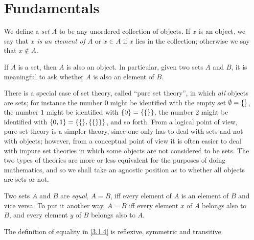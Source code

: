 \section{Fundamentals}\label{sec:3.1}

\begin{defn}\label{3.1.1}
	We define a \emph{set} \(A\) to be any unordered collection of objects.
	If \(x\) is an object, we say that \emph{\(x\) is an element of \(A\)} or \(x \in A\) if \(x\) lies in the collection;
	otherwise we say that \(x \notin A\).
\end{defn}

\begin{ax}\label{3.1}
	If \(A\) is a set, then \(A\) is also an object.
	In particular, given two sets \(A\) and \(B\), it is meaningful to ask whether \(A\) is also an element of \(B\).
\end{ax}

\setcounter{thm}{2}
\begin{rmk}\label{3.1.3}
	There is a special case of set theory, called ``pure set theory'', in which \emph{all} objects are sets;
	for instance the number \(0\) might be identified with the empty set \(\emptyset = \left\lbrace\right\rbrace\), the number \(1\) might be identified with \(\left\lbrace0\right\rbrace = \left\lbrace\left\lbrace\right\rbrace\right\rbrace\), the number \(2\) might be identified with \(\set{0, 1} = \set{\set{}, \set{\set{}}}\), and so forth.
	From a logical point of view, pure set theory is a simpler theory, since one only has to deal with sets and not with objects;
	however, from a conceptual point of view it is often easier to deal with impure set theories in which some objects are not considered to be sets.
	The two types of theories are more or less equivalent for the purposes of doing mathematics, and so we shall take an agnostic position as to whether all objects are sets or not.
\end{rmk}

\begin{defn}\label{3.1.4}
	Two sets \(A\) and \(B\) are \emph{equal}, \(A = B\), iff every element of \(A\) is an element of \(B\) and vice versa.
	To put it another way, \(A = B\) iff every element \(x\) of \(A\) belongs also to \(B\), and every element \(y\) of \(B\) belongs also to \(A\).
\end{defn}

\begin{ac}\label{ac:3.1.1}
	The definition of equality in \cref{3.1.4} is reflexive, symmetric and transitive.
\end{ac}

